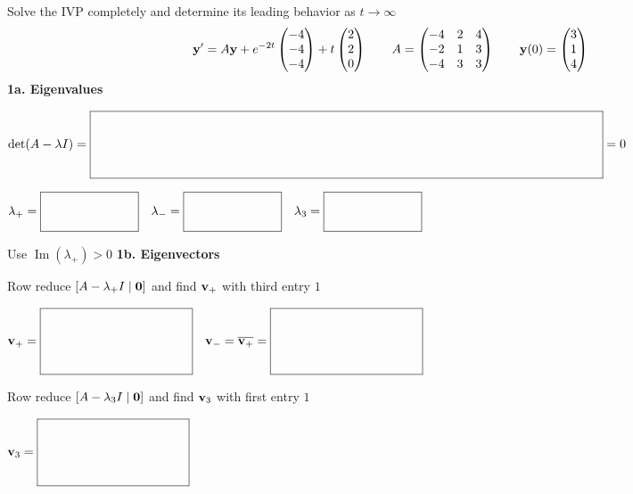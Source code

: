 \documentclass[11pt,letterpaper]{article}
\newcommand{\IVPBlank}[2]{%
  \vcenter{\hbox{$\boxed{\rule{0pt}{#2}\makebox[#1]{}}$}}}
\newcommand{\IVPWork}[1]{%
  \par\noindent\fbox{\parbox[t][#1][t]{\dimexpr\linewidth-2\fboxsep-2\fboxrule\relax}{%
    \vfill\textcolor{black!18}{\rule{\linewidth}{0.3pt}}}}\par}
\begin{document}
Solve the IVP completely and determine its leading behavior as $t\to\infty$
\[
  \mathbf{y}'=A\mathbf{y}+e^{-2t}\begin{pmatrix}-4\\-4\\-4\end{pmatrix}
  +t\begin{pmatrix}2\\2\\0\end{pmatrix}
  \qquad A=\begin{pmatrix}-4&2&4\\-2&1&3\\-4&3&3\end{pmatrix}
  \qquad\mathbf{y}(0)=\begin{pmatrix}3\\1\\4\end{pmatrix}
\]
\textbf{1a. Eigenvalues}\par
$\displaystyle\det(A-\lambda I)=\IVPBlank{5.6in}{0.65in}=0$
\par
$\displaystyle\lambda_+=\IVPBlank{1in}{0.35in}\quad
\lambda_-=\IVPBlank{1in}{0.35in}\quad
\lambda_3=\IVPBlank{1in}{0.35in}$
\par Use $\operatorname{Im}(\lambda_+)>0$
\textbf{1b. Eigenvectors}\par
Row reduce $[A-\lambda_+I\mid\mathbf{0}]$ and find $\mathbf{v}_+$ with third entry $1$
\IVPWork{1.35in}
$\displaystyle\vect{v}_+=\IVPBlank{1.6in}{0.65in}\quad
\vect{v}_-=\overline{\vect{v}_+}=\IVPBlank{1.6in}{0.65in}$
\par Row reduce $[A-\lambda_3I\mid\mathbf{0}]$ and find $\mathbf{v}_3$ with first entry $1$
\IVPWork{1.15in}
$\displaystyle\vect{v}_3=\IVPBlank{1.6in}{0.65in}$
\end{document}
